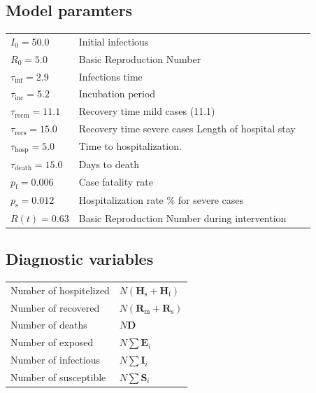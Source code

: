 \documentclass[twoside,11pt]{article}
\newcommand{\Tinc}  {\tau_\textrm{inc}}
\newcommand{\Tinf}  {\tau_\textrm{inf}}
\newcommand{\Tdeath}{\tau_\textrm{death}}
\newcommand{\Trecm} {\tau_\textrm{recm}}
\newcommand{\Trecs} {\tau_\textrm{recs}}
\newcommand{\Thosp} {\tau_\textrm{hosp}}
\newcommand{\rmf}{\mathrm{f}}
\newcommand{\rmm}{\mathrm{m}}
\newcommand{\rms}{\mathrm{s}}
\newcommand{\bmD}{{\mathbf{D}}}
\newcommand{\bmE}{{\mathbf{E}}}
\newcommand{\bmH}{{\mathbf{H}}}
\newcommand{\bmI}{{\mathbf{I}}}
\newcommand{\bmR}{{\mathbf{R}}}
\newcommand{\bmS}{{\mathbf{S}}}
\begin{document}
%
\subsection{Model paramters}
\begin{center}
\small
\begin{tabular}{lll}
\hline
$I_0    = 50.0                $&    Initial infectious                                  \\
$R_0    = 5.0                 $&    Basic Reproduction Number                           \\
$\Tinf  = 2.9                 $&    Infections time                                     \\
$\Tinc  = 5.2                 $&    Incubation period                                   \\
$\Trecm = 11.1                $&    Recovery time mild cases (11.1)                     \\
$\Trecs = 15.0                $&    Recovery time severe cases Length of hospital stay  \\
$\Thosp = 5.0                 $&    Time to hospitalization.                            \\
$\Tdeath = 15.0               $&    Days to death                                       \\
$p_\rmf = 0.006               $&    Case fatality rate                                  \\
$p_\rms = 0.012               $&    Hospitalization rate \% for severe cases            \\
$R(t)   = 0.63                $&    Basic Reproduction Number during intervention       \\
\hline
\end{tabular}
\end{center}
%
%
\subsection{Diagnostic variables}
\begin{center}
\begin{tabular}{ll}
\hline
Number of hospitelized & $N(\bmH_\rms + \bmH_\rmf)$ \\
Number of recovered    & $N(\bmR_\rmm+\bmR_\rms)$ \\
Number of deaths       & $N\bmD$ \\
Number of exposed      & $N\sum \bmE_i$ \\
Number of infectious   & $N\sum \bmI_i$ \\
Number of susceptible  & $N\sum \bmS_i$ \\
\hline
\end{tabular}
\end{center}




\end{document}
